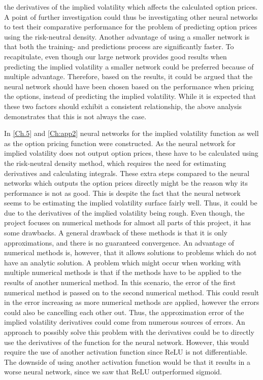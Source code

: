 the derivatives of the implied volatility which affects the calculated option prices. A point of further investigation could thus be investigating other neural networks to test their comparative performance for the problem of predicting option prices using the risk-neutral density. Another advantage of using a smaller network is that both the training- and predictions process are significantly faster. To recapitulate, even though our large network provides good results when predicting the implied volatility a smaller network could be preferred because of multiple advantage. Therefore, based on the results, it could be argued that the neural network should have been chosen based on the performance when pricing the options, instead of predicting the implied volatility. While it is expected that these two factors should exhibit a consistent relationship, the above analysis demonstrates that this is not always the case.

In \autoref{Ch.5} and \autoref{Ch:app2} neural networks for the implied volatility function as well as the option pricing function were constructed. As the neural network for implied volatility does not output option prices, these have to be calculated using the risk-neutral density method, which requires the need for estimating derivatives and calculating integrals. These extra steps compared to the neural networks which outputs the option prices directly might be the reason why its performance is not as good. This is despite the fact that the neural network seems to be estimating the implied volatility surface fairly well. Thus, it could be due to the derivatives of the implied volatility being rough. Even though, the project focuses on numerical methods for almost all parts of this project, it has some drawbacks. A general drawback of these methods is that it is only approximations, and there is no guaranteed convergence. An advantage of numerical methods is, however, that it allows solutions to problems which do not have an analytic solution. A problem which might occur when working with multiple numerical methods is that if the methods have to be applied to the results of another numerical method. In this scenario, the error of the first numerical method is passed on to the second numerical method. This could result in the error increasing as more numerical methods are applied, however the errors could also be cancelling each other out. Thus, the approximation error of the implied volatility derivatives could come from numerous sources of errors. An approach to possibly solve this problem with the derivatives could be to directly use the derivatives of the function for the neural network. However, this would require the use of another activation function since ReLU is not differentiable. The downside of using another activation function would be that it results in a worse neural network, since we saw that ReLU outperformed sigmoid.

